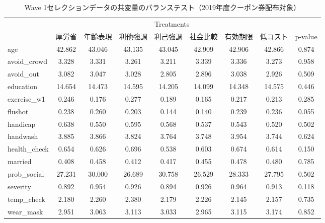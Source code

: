 \documentclass[
  11pt,
  a4paper,
]{article}
\begin{document}
\begin{table}

\caption{\label{tab:show-int-coupon1-balance}Wave 1セレクションデータの共変量のバランステスト（2019年度クーポン券配布対象）}
\centering
\begin{tabular}[t]{lcccccccc}
\toprule
\multicolumn{1}{c}{ } & \multicolumn{7}{c}{Treatments} & \multicolumn{1}{c}{ } \\
\cmidrule(l{3pt}r{3pt}){2-8}
  & 厚労省 & 年齢表現 & 利他強調 & 利己強調 & 社会比較 & 有効期限 & 低コスト & p-value\\
\midrule
age & 42.862 & 43.046 & 43.135 & 43.045 & 42.909 & 42.906 & 42.866 & 0.874\\
avoid\_crowd & 3.328 & 3.331 & 3.261 & 3.211 & 3.339 & 3.336 & 3.273 & 0.958\\
avoid\_out & 3.082 & 3.047 & 3.028 & 2.805 & 2.896 & 3.038 & 2.926 & 0.509\\
education & 14.654 & 14.473 & 14.595 & 14.205 & 14.099 & 14.348 & 14.575 & 0.446\\
exercise\_w1 & 0.246 & 0.176 & 0.277 & 0.189 & 0.165 & 0.217 & 0.213 & 0.285\\
flushot & 0.238 & 0.260 & 0.203 & 0.144 & 0.140 & 0.239 & 0.236 & 0.055\\
handicap & 0.638 & 0.550 & 0.595 & 0.568 & 0.537 & 0.543 & 0.520 & 0.502\\
handwash & 3.885 & 3.866 & 3.824 & 3.764 & 3.748 & 3.954 & 3.744 & 0.624\\
health\_check & 0.654 & 0.626 & 0.696 & 0.538 & 0.603 & 0.674 & 0.614 & 0.150\\
married & 0.408 & 0.458 & 0.412 & 0.417 & 0.455 & 0.478 & 0.480 & 0.785\\
prob\_social & 27.231 & 30.000 & 26.689 & 30.758 & 26.529 & 28.333 & 27.795 & 0.502\\
severity & 0.892 & 0.954 & 0.926 & 0.894 & 0.926 & 0.964 & 0.913 & 0.118\\
temp\_check & 2.180 & 2.260 & 2.380 & 2.179 & 2.226 & 2.145 & 2.157 & 0.735\\
wear\_mask & 2.951 & 3.063 & 3.113 & 3.033 & 2.965 & 3.115 & 3.174 & 0.852\\
\bottomrule
\end{tabular}
\end{table}
\end{document}
